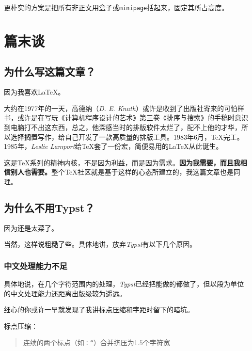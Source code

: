 \documentclass[10pt,openany]{book}
\begin{document}
\begin{sloppypar}
    

    更朴实的方案是把所有非正文用盒子或\texttt{minipage}括起来，固定其所占高度。

    

    \chapter{篇末谈}

    \section{为什么写这篇文章？}

    因为我喜欢{\LaTeX}。

    大约在1977年的一天，高德纳（\emph{D. E. Knuth}）或许是收到了出版社寄来的可怕样书，或许是在写玩《计算机程序设计的艺术》第三卷《排序与搜索》的手稿时意识到电脑打不出这东西，总之，他深感当时的排版软件太烂了，配不上他的才华，所以选择搁置写作，给自己开发了一款高质量的排版工具。1983年6月，{\TeX}完工。1985年，\emph{Leslie Lamport}给{\TeX}套了一份宏，简便易用的{\LaTeX}从此诞生。

    这是{\TeX}系列的精神内核，不是因为利益，而是因为需求。\textbf{因为我需要，而且我相信别人也需要。}整个{\TeX}社区就是基于这样的心态所建立的，我这篇文章也是同理。

    \section{为什么不用Typst？}

    因为还是太菜了。

    当然，这样说粗糙了些。具体地讲，放弃\emph{Typst}有以下几个原因。

    \subsection{中文处理能力不足}

    具体地说，在几个字符范围内的处理，\emph{Typst}已经把能做的都做了，但以段为单位的中文处理能力还距离出版级较为遥远。

    细心的你或许一早就发现了我讲标点压缩和字距时留下的暗坑。

    标点压缩：

    \begin{quote} 连续的两个标点（如\texttt{：“}）合并挤压为1.5个字符宽 \end{quote}


\end{sloppypar}
\end{document}
